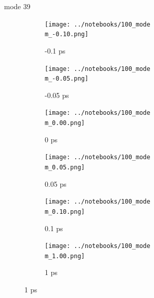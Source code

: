 \documentclass{beamer}
\newcommand\w{0.32}
\begin{document}
\renewcommand\m{39}
\begin{frame}{mode \m}
	\begin{figure}
		\centering
		\begin{subfigure}[b]{\w\textwidth}
			\centering
			\texttt{[image: ../notebooks/100\_mode\\m\_-0.10.png]}
			\caption{-0.1 ps}
		\end{subfigure}
		\begin{subfigure}[b]{\w\textwidth}
			\centering
			\texttt{[image: ../notebooks/100\_mode\\m\_-0.05.png]}
			\caption{-0.05 ps}
		\end{subfigure}
		\begin{subfigure}[b]{\w\textwidth}
			\centering
			\texttt{[image: ../notebooks/100\_mode\\m\_0.00.png]}
			\caption{0 ps}
		\end{subfigure}
		\begin{subfigure}[b]{\w\textwidth}
			\centering
			\texttt{[image: ../notebooks/100\_mode\\m\_0.05.png]}
			\caption{0.05 ps}
		\end{subfigure}
		\begin{subfigure}[b]{\w\textwidth}
			\centering
			\texttt{[image: ../notebooks/100\_mode\\m\_0.10.png]}
			\caption{0.1 ps}
		\end{subfigure}
		\begin{subfigure}[b]{\w\textwidth}
			\centering
			\texttt{[image: ../notebooks/100\_mode\\m\_1.00.png]}
			\caption{1 ps}
		\end{subfigure}
	\end{figure}
\end{frame}
\end{document}
